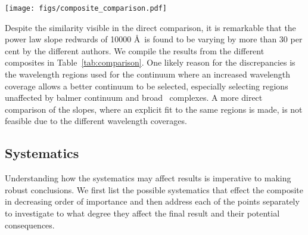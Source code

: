 \documentclass{aa}    %
\newcommand{\figlabel}[1]{\label{fig:#1}}
\newcommand{\Tab}[1]{Table~\ref{tab:#1}}
\newcommand{\tab}[1]{\Tab{#1}}
\newcommand{\sectlabel}[1]{\label{sect:#1}}
\newcommand{\lya}{Ly$\alpha$}
\newcommand{\feii}{\ion{Fe}{ii}}
\begin{document}
{\begin{figure*}[t!]
   \texttt{[image: figs/composite\_comparison.pdf]}
   \caption[]{Comparison of different composites. The composites by \citet{Lusso2015, VandenBerk2001, Telfer2002, Francis1991} are normalized to the X-shooter composite at $\sim 1450$ \AA~and the composite by \citet{Glikman2006} is normalized to ours at $\sim 3850$ \AA. Significant differences is visible blueward of \lya~due to differing IGM correction methods. Above 5000 \AA~ significant host galaxy contamination is visible in the composite by \citet{VandenBerk2001}. Overplot in blue is a pure power law with slope $\alpha = -1.7$ and normalized at $\sim 1450$ \AA.}
  \figlabel{composite_comparison}
 \end{figure*}
  
 
Despite the similarity visible in the direct comparison, it is remarkable that the power law slope redwards of 10000 \AA~is found to be varying by more than 30 per cent by the different authors. We compile the results from the different composites in \tab{comparison}. One likely reason for the discrepancies is the wavelength regions used for the continuum where an increased wavelength coverage allows a better continuum to be selected, especially selecting regions unaffected by balmer continuum and broad \feii~complexes. A more direct comparison of the slopes, where an explicit fit to the same regions is made, is not feasible due to the different wavelength coverages. 





\subsection{Systematics}  \sectlabel{systematics}

Understanding how the systematics may affect results is imperative to making robust conclusions. We first list the possible systematics that effect the composite in decreasing order of importance and then address each of the points separately to investigate to what degree they affect the final result and their potential consequences.


%



}
\end{document}
